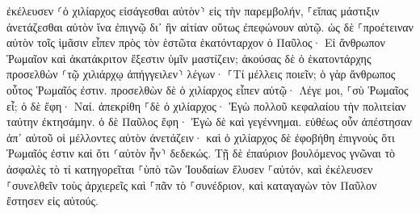 \documentclass[twoside, 9pt]{extreport}
\begin{document}
ἐκέλευσεν ⸂ὁ χιλίαρχος εἰσάγεσθαι αὐτὸν⸃ εἰς τὴν παρεμβολήν, ⸀εἴπας μάστιξιν ἀνετάζεσθαι αὐτὸν ἵνα ἐπιγνῷ δι᾽ ἣν αἰτίαν οὕτως ἐπεφώνουν αὐτῷ. 
ὡς δὲ ⸀προέτειναν αὐτὸν τοῖς ἱμᾶσιν εἶπεν πρὸς τὸν ἑστῶτα ἑκατόνταρχον ὁ Παῦλος· Εἰ ἄνθρωπον Ῥωμαῖον καὶ ἀκατάκριτον ἔξεστιν ὑμῖν μαστίζειν; 
ἀκούσας δὲ ὁ ἑκατοντάρχης προσελθὼν ⸂τῷ χιλιάρχῳ ἀπήγγειλεν⸃ λέγων· ⸀Τί μέλλεις ποιεῖν; ὁ γὰρ ἄνθρωπος οὗτος Ῥωμαῖός ἐστιν. 
προσελθὼν δὲ ὁ χιλίαρχος εἶπεν αὐτῷ· Λέγε μοι, ⸀σὺ Ῥωμαῖος εἶ; ὁ δὲ ἔφη· Ναί. 
ἀπεκρίθη ⸀δὲ ὁ χιλίαρχος· Ἐγὼ πολλοῦ κεφαλαίου τὴν πολιτείαν ταύτην ἐκτησάμην. ὁ δὲ Παῦλος ἔφη· Ἐγὼ δὲ καὶ γεγέννημαι. 
εὐθέως οὖν ἀπέστησαν ἀπ᾽ αὐτοῦ οἱ μέλλοντες αὐτὸν ἀνετάζειν· καὶ ὁ χιλίαρχος δὲ ἐφοβήθη ἐπιγνοὺς ὅτι Ῥωμαῖός ἐστιν καὶ ὅτι ⸂αὐτὸν ἦν⸃ δεδεκώς. 
Τῇ δὲ ἐπαύριον βουλόμενος γνῶναι τὸ ἀσφαλὲς τὸ τί κατηγορεῖται ⸀ὑπὸ τῶν Ἰουδαίων ἔλυσεν ⸀αὐτόν, καὶ ἐκέλευσεν ⸀συνελθεῖν τοὺς ἀρχιερεῖς καὶ ⸀πᾶν τὸ ⸀συνέδριον, καὶ καταγαγὼν τὸν Παῦλον ἔστησεν εἰς αὐτούς. 
\end{document}
